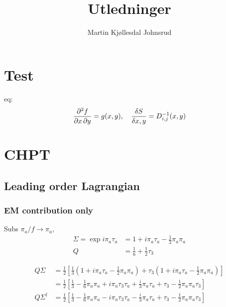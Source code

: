 \documentclass{book}
\title{\huge{Utledninger}}
\author{
    \large{Martin Kjøllesdal Johnsrud }
    }
\begin{document}
\maketitle
\setlength{\parindent}{0em}
\setlength{\parskip}{0.8em}

\chapter{Test}
eq:
\begin{equation}
    \pdv{f}{x,y} = g(x, y), \quad
    \fdv{S}{x,y}= D^{-1}_{i, j}(x, y)
\end{equation}

\chapter{CHPT}
\section{Leading order Lagrangian}

\subsection{EM contribution only}
Subs $\pi_a / f \rightarrow \pi_a$,
\begin{align}
    \Sigma = \exp{i \pi_a \tau_a}
    & = 1 + i\pi_a\tau_a - \frac{1}{2}\pi_a \pi_a \\
    Q 
    & = \frac{1}{6} + \frac{1}{2} \tau_3
\end{align}

\begin{align}
    Q\Sigma 
    & = 
    \frac{1}{2}
    \left[
        \frac{1}{3} 
        \left(
            1 + i\pi_a\tau_a - \frac{1}{2}\pi_a \pi_a
        \right)
        +
        \tau_3
        \left(
            1 + i\pi_a\tau_a - \frac{1}{2}\pi_a \pi_a
        \right)
    \right] \\
    & = 
    \frac{1}{2}
    \left[
        \frac{1}{3} 
        - \frac{1}{6}\pi_a \pi_a
        + i \pi_a \tau_3 \tau_a
        + \frac{i}{3}  \pi_a \tau_a
        + \tau_3
        - \frac{1}{2}\pi_a \pi_a \tau_3 
    \right] \\
    Q \Sigma^\dagger
    & = 
    \frac{1}{2}
    \left[
        \frac{1}{3} 
        - \frac{1}{6}\pi_a \pi_a
        - i \pi_a \tau_3 \tau_a
        - \frac{i}{3}  \pi_a \tau_a
        +\tau_3
        - \frac{1}{2}\pi_a \pi_a \tau_3 
    \right] 
\end{align}
\end{document}
